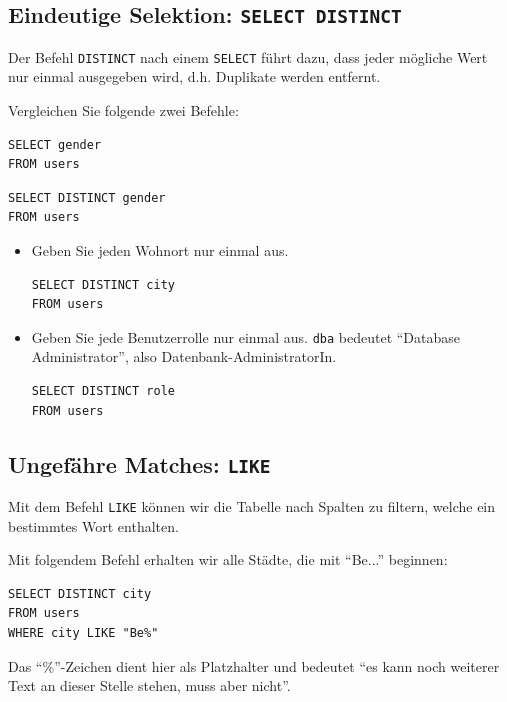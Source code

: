 \subsection{Eindeutige Selektion: \lstinline[style=sql]|SELECT DISTINCT|}

Der Befehl \lstinline[style=sql]|DISTINCT| nach einem \lstinline[style=sql]|SELECT| führt dazu, dass jeder mögliche Wert nur einmal ausgegeben wird, d.h. Duplikate werden entfernt. 

\begin{aufgabe}{}
Vergleichen Sie folgende zwei Befehle:

\begin{lstlisting}[style=sql]
SELECT gender
FROM users
\end{lstlisting}

\begin{lstlisting}[style=sql]
SELECT DISTINCT gender
FROM users
\end{lstlisting}
\end{aufgabe}

\begin{aufgabe}{}
\begin{itemize}
\item Geben Sie jeden Wohnort nur einmal aus.
\begin{myantwort}
\begin{lstlisting}[style=sql]
SELECT DISTINCT city 
FROM users
\end{lstlisting}
\end{myantwort}
\item Geben Sie jede Benutzerrolle nur einmal aus. \texttt{dba} bedeutet ``Database Administrator'', also Datenbank-AdministratorIn.
\begin{myantwort}
\begin{lstlisting}[style=sql]
SELECT DISTINCT role
FROM users
\end{lstlisting}
\end{myantwort}
\end{itemize}
\end{aufgabe}


\subsection{Ungefähre Matches: \lstinline[style=sql]|LIKE|}

Mit dem Befehl \lstinline[style=sql]|LIKE| können wir die Tabelle nach Spalten zu filtern, welche ein bestimmtes Wort enthalten. 

\begin{myexample}
Mit folgendem Befehl erhalten wir alle Städte, die mit ``Be...'' beginnen:

\begin{lstlisting}[style=sql]
SELECT DISTINCT city 
FROM users 
WHERE city LIKE "Be%"
\end{lstlisting}

Das ``\%''-Zeichen dient hier als Platzhalter und bedeutet ``es kann noch weiterer Text an dieser Stelle stehen, muss aber nicht''.

\end{myexample}


